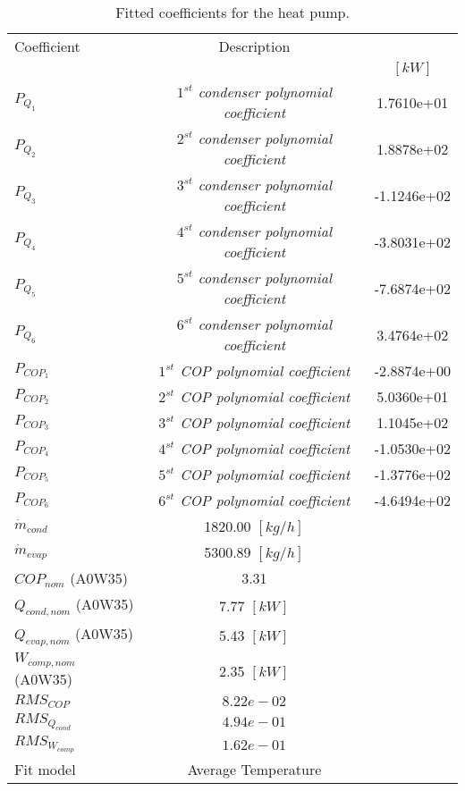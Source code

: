 \documentclass[english]{SPFShortReport}
\author{jschmidl}
\begin{document}
\begin{table}[!ht]
\begin{small}
\caption{Fitted coefficients for the heat pump.}
\begin{center}
\resizebox{12cm}{!} 
{
\begin{tabular}{l | c c } 
\hline
\hline
Coefficient &Description & \\ 
 & &$[kW]$\\ 
\hline
$P_{Q_{1}}$ & \emph{$1^{st}$ condenser polynomial coefficient}  & 1.7610e+01    \\ 
$P_{Q_{2}}$ & \emph{$2^{st}$ condenser polynomial coefficient}  & 1.8878e+02    \\ 
$P_{Q_{3}}$ & \emph{$3^{st}$ condenser polynomial coefficient}  & -1.1246e+02    \\ 
$P_{Q_{4}}$ & \emph{$4^{st}$ condenser polynomial coefficient}  & -3.8031e+02    \\ 
$P_{Q_{5}}$ & \emph{$5^{st}$ condenser polynomial coefficient}  & -7.6874e+02    \\ 
$P_{Q_{6}}$ & \emph{$6^{st}$ condenser polynomial coefficient}  & 3.4764e+02    \\ 
\hline
$P_{COP_{1}}$ & \emph{$1^{st}$ COP polynomial coefficient}  & -2.8874e+00    \\ 
$P_{COP_{2}}$ & \emph{$2^{st}$ COP polynomial coefficient}  & 5.0360e+01    \\ 
$P_{COP_{3}}$ & \emph{$3^{st}$ COP polynomial coefficient}  & 1.1045e+02    \\ 
$P_{COP_{4}}$ & \emph{$4^{st}$ COP polynomial coefficient}  & -1.0530e+02    \\ 
$P_{COP_{5}}$ & \emph{$5^{st}$ COP polynomial coefficient}  & -1.3776e+02    \\ 
$P_{COP_{6}}$ & \emph{$6^{st}$ COP polynomial coefficient}  & -4.6494e+02    \\ 
\hline
$\dot m_{cond}$ & 1820.00 $[kg/h]$ \\ 
$\dot m_{evap}$ & 5300.89 $[kg/h]$ \\ 
\hline
$COP_{nom}$ (A0W35)& 3.31 \\ 
$Q_{cond,nom}$ (A0W35)& 7.77 $[kW]$\\ 
$Q_{evap,nom}$ (A0W35)& 5.43 $[kW]$\\ 
$W_{comp,nom}$ (A0W35)& 2.35 $[kW]$\\ 
\hline
 $RMS_{COP}$ & $8.22e-02$ \\ 
 $RMS_{Q_{cond}}$ & $4.94e-01$ \\ 
 $RMS_{W_{comp}}$ & $1.62e-01$ \\ 
\hline
Fit model & Average Temperature\\ 
\hline
\hline
\end{tabular}
}
\label{CoefTable}
\end{center}
\end{small}
\end{table}
\end{document}
